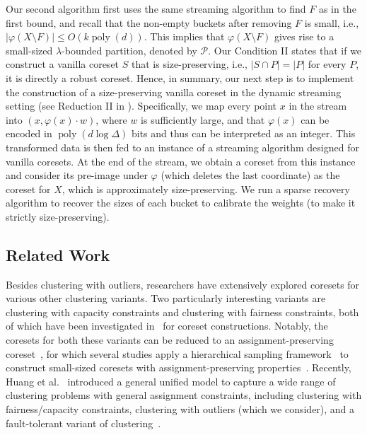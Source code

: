 \documentclass[letterpaper,11pt]{article}
\theoremstyle{plain}
\theoremstyle{definition}
\theoremstyle{remark}
\DeclareMathOperator{\poly}{poly}
\renewcommand{\phi}{\varphi}
\newcommand{\calP}{\mathcal{P}}
\begin{document}
Our second algorithm first uses the same streaming algorithm to find $F$ as in the first bound, and recall that the non-empty buckets after removing $F$ is small, i.e., $|\phi(X\setminus F)|\le O(k\poly(d))$. This implies that $\phi(X\setminus F)$ gives rise to a small-sized $\lambda$-bounded partition, denoted by $\calP$. 
Our Condition II states that if we construct a vanilla coreset $S$ that is size-preserving, i.e., $|S \cap P| = |P|$ for every $P$, it is directly a robust coreset.
Hence, in summary, our next step is to implement the construction of a size-preserving vanilla coreset in the dynamic streaming setting (see Reduction II in ). Specifically, we map every point $x$ in the stream into $(x,\phi(x)\cdot w)$, where $w$ is sufficiently large, and that $\phi(x)$ can be encoded in $\poly(d \log \Delta)$ bits and thus can be interpreted as an integer.
This transformed data is then fed to an instance of a streaming algorithm designed for vanilla coresets. 
At the end of the stream, we obtain a coreset from this instance and consider its pre-image under $\phi$ (which deletes the last coordinate) as the coreset for $X$, which is approximately size-preserving.
We run a sparse recovery algorithm to recover the sizes of each bucket to calibrate the weights (to make it strictly size-preserving).




















 \subsection{Related Work}
\label{sec:related}
Besides clustering with outliers, researchers have extensively explored coresets for various other clustering variants. 
Two particularly interesting variants are clustering with capacity constraints
and clustering with fairness constraints, both of which have been investigated in~\cite{DBLP:conf/nips/Chierichetti0LV17, DBLP:conf/waoa/0001SS19, DBLP:conf/nips/HuangJV19,Cohen-Addad2019Fixed-Parameter,DBLP:conf/icalp/BandyapadhyayFS21, Braverman22Power} for coreset constructions.
Notably, the coresets for both these variants can be reduced to an assignment-preserving coreset~\cite{DBLP:conf/waoa/0001SS19, DBLP:conf/nips/HuangJV19}, for which several studies apply a hierarchical sampling framework~\cite{Chen09OnCoresets} to construct small-sized coresets with assignment-preserving properties~\cite{DBLP:conf/icalp/BandyapadhyayFS21, Braverman22Power}. Recently, Huang et al.~\cite{Huang2023General} introduced a general unified model to capture a wide range of clustering problems with general assignment constraints, including clustering with fairness/capacity constraints, clustering with outliers (which we consider), and a fault-tolerant variant of clustering~\cite{DBLP:journals/tcs/KhullerPS00}.
\end{document}
